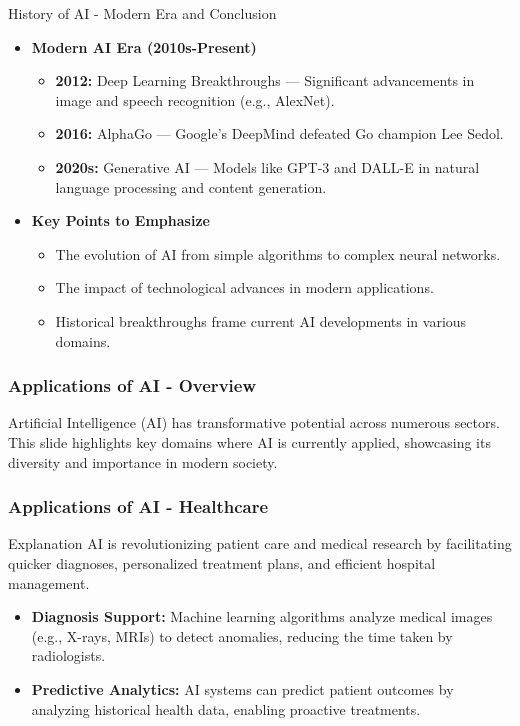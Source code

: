 \documentclass[aspectratio=169]{beamer}
\begin{document}
\begin{frame}[fragile]{History of AI - Modern Era and Conclusion}
    \begin{itemize}
        \item \textbf{Modern AI Era (2010s-Present)}
            \begin{itemize}
                \item \textbf{2012:} Deep Learning Breakthroughs — Significant advancements in image and speech recognition (e.g., AlexNet).
                \item \textbf{2016:} AlphaGo — Google’s DeepMind defeated Go champion Lee Sedol.
                \item \textbf{2020s:} Generative AI — Models like GPT-3 and DALL-E in natural language processing and content generation.
            \end{itemize}
    
        \item \textbf{Key Points to Emphasize}
            \begin{itemize}
                \item The evolution of AI from simple algorithms to complex neural networks.
                \item The impact of technological advances in modern applications.
                \item Historical breakthroughs frame current AI developments in various domains.
            \end{itemize}
    \end{itemize}
\end{frame}

\begin{frame}[fragile]
    \frametitle{Applications of AI - Overview}
    Artificial Intelligence (AI) has transformative potential across numerous sectors. This slide highlights key domains where AI is currently applied, showcasing its diversity and importance in modern society.
\end{frame}

\begin{frame}[fragile]
    \frametitle{Applications of AI - Healthcare}
    \begin{block}{Explanation}
        AI is revolutionizing patient care and medical research by facilitating quicker diagnoses, personalized treatment plans, and efficient hospital management.
    \end{block}
    
    \begin{itemize}
        \item \textbf{Diagnosis Support:} 
        Machine learning algorithms analyze medical images (e.g., X-rays, MRIs) to detect anomalies, reducing the time taken by radiologists.
        
        \item \textbf{Predictive Analytics:} 
        AI systems can predict patient outcomes by analyzing historical health data, enabling proactive treatments.
    \end{itemize}
\end{frame}
\end{document}
